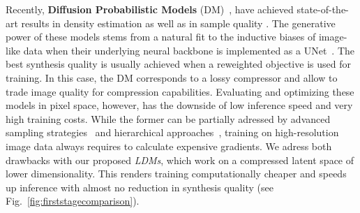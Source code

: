 \documentclass[10pt,twocolumn,letterpaper]{article}
\begin{document}
Recently, \textbf{Diffusion Probabilistic Models} (DM)~\cite{DBLP:journals/corr/Sohl-DicksteinW15}, have achieved state-of-the-art results in density estimation \cite{DBLP:journals/corr/abs-2107-00630} as well as in sample quality \cite{DBLP:journals/corr/abs-2105-05233}. The generative power of these models stems from a natural fit to the inductive biases of image-like data when their underlying neural backbone is implemented as a UNet~\cite{DBLP:conf/miccai/RonnebergerFB15, DBLP:conf/nips/HoJA20, DBLP:journals/corr/abs-2011-13456, DBLP:journals/corr/abs-2105-05233}.
The best synthesis quality is usually achieved when a reweighted objective \cite{DBLP:conf/nips/HoJA20}
is used for training. In this case, the DM corresponds to a lossy compressor and allow to trade image quality for compression capabilities.
Evaluating and optimizing these models in pixel space, however, has the downside of low inference speed and very high training costs.
While the former can be partially adressed by advanced sampling strategies~\cite{DBLP:conf/iclr/SongME21, DBLP:journals/corr/abs-2104-02600, DBLP:journals/corr/abs-2106-00132} and hierarchical approaches~\cite{DBLP:journals/corr/abs-2106-15282, DBLP:journals/corr/abs-2106-05931}, training on high-resolution image data always requires to calculate expensive gradients.
We adress both drawbacks with our proposed \emph{LDMs}, which work on a compressed latent space of lower dimensionality.
 This renders training computationally cheaper and speeds up inference with
 almost no reduction in synthesis quality (see
 Fig.~\ref{fig:firststagecomparison}).
\end{document}
